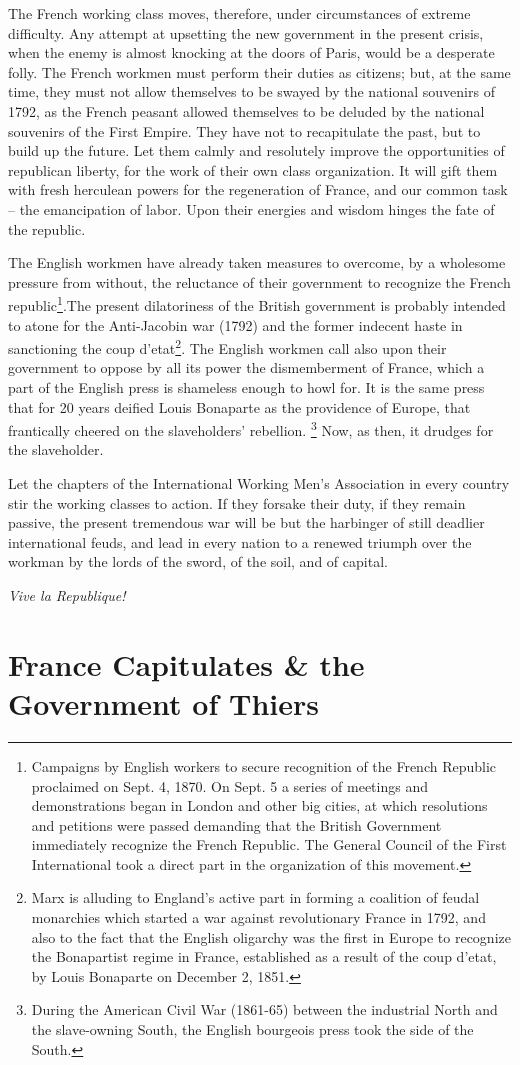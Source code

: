 \documentclass{book}
\begin{document}
The French working class moves, therefore, under circumstances of extreme
difficulty. Any attempt at upsetting the new government in the present
crisis, when the enemy is almost knocking at the doors of Paris, would be
a desperate folly. The French workmen must perform their duties as
citizens; but, at the same time, they must not allow themselves to be
swayed by the national souvenirs of 1792, as the French peasant allowed
themselves to be deluded by the national souvenirs of the First Empire.
They have not to recapitulate the past, but to build up the future. Let
them calmly and resolutely improve the opportunities of republican
liberty, for the work of their own class organization. It will gift them
with fresh herculean powers for the regeneration of France, and our common
task – the emancipation of labor. Upon their energies and wisdom hinges
the fate of the republic.

The English workmen have already taken measures to overcome, by
a wholesome pressure from without, the reluctance of their government to
recognize the French republic\footnote{Campaigns by English workers to
secure recognition of the French Republic proclaimed on Sept. 4, 1870. On
Sept. 5 a series of meetings and demonstrations began in London and other
big cities, at which resolutions and petitions were passed demanding that
the British Government immediately recognize the French Republic. The
General Council of the First International took a direct part in the
organization of this movement.}.The present dilatoriness of the British
government is probably intended to atone for the Anti-Jacobin war (1792)
and the former indecent haste in sanctioning the coup d’etat\footnote{
Marx is alluding to England’s active part in forming a coalition of feudal
monarchies which started a war against revolutionary France in 1792, and
also to the fact that the English oligarchy was the first in Europe to
recognize the Bonapartist regime in France, established as a result of the
coup d’etat, by Louis Bonaparte on December 2, 1851.}. The English workmen
call also upon their government to oppose by all its power the
dismemberment of France, which a part of the English press is shameless
enough to howl for. It is the same press that for 20 years deified Louis
Bonaparte as the providence of Europe, that frantically cheered on the
slaveholders’ rebellion. \footnote{During the American Civil War (1861-65)
between the industrial North and the slave-owning South, the English
bourgeois press took the side of the South.} Now, as then, it drudges for
the slaveholder.

Let the chapters of the International Working Men’s Association in every
country stir the working classes to action. If they forsake their duty, if
they remain passive, the present tremendous war will be but the harbinger
of still deadlier international feuds, and lead in every nation to
a renewed triumph over the workman by the lords of the sword, of the soil,
and of capital.

\emph{Vive la Republique!}


\chapter{France Capitulates \& the Government of Thiers}
\end{document}
